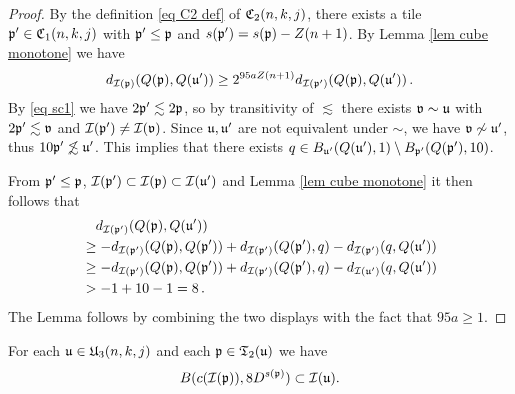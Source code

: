\begin{proof}
    By the definition \eqref{eq C2 def} of $\mathfrak C_2(n,k,j)$, there exists a tile $\mathfrak p' \in \mathfrak C_1(n,k,j)$ with $\mathfrak p' \le \mathfrak p$ and $s(\mathfrak p') = s(\mathfrak p)- Z(n+1)$.
    By Lemma \ref{lem cube monotone} we have
    $$
        d_{\mathcal{I}(\mathfrak p)}(Q(\mathfrak p), Q(\mathfrak u')) \ge 2^{95a Z(n+1)} d_{\mathcal{I}(\mathfrak p')}(Q(\mathfrak p), Q(\mathfrak u'))\,.
    $$
    By \eqref{eq sc1} we have $2\mathfrak p' \lesssim 2\mathfrak p$, so by transitivity of $\lesssim$ there exists $\mathfrak{v} \sim \mathfrak u$ with $2\mathfrak p' \lesssim \mathfrak{v}$ and $\mathcal{I}(\mathfrak p') \ne \mathcal{I}(\mathfrak{v})$. Since $\mathfrak u, \mathfrak u'$ are not equivalent under $\sim$, we have $\mathfrak{v} \not \sim \mathfrak u'$, thus $10\mathfrak p' \not\lesssim \mathfrak u'$. This implies that there exists $q \in B_{\mathfrak u'}(Q(\mathfrak u'), 1) \setminus B_{\mathfrak p'}(Q(\mathfrak p'), 10)$.

    From $\mathfrak p' \le \mathfrak p$, $\mathcal{I}(\mathfrak p') \subset \mathcal{I}(\mathfrak p) \subset \mathcal{I}(\mathfrak u')$ and Lemma \ref{lem cube monotone} it then follows that
    \begin{align*}
        &\quad d_{\mathcal{I}(\mathfrak p')}(Q(\mathfrak p), Q(\mathfrak u'))\\
        &\ge -d_{\mathcal{I}(\mathfrak p')}(Q(\mathfrak p), Q(\mathfrak p')) + d_{\mathcal{I}(\mathfrak p')}(Q(\mathfrak p'), q) - d_{\mathcal{I}(\mathfrak p')}(q, Q(\mathfrak u'))\\
        &\ge -d_{\mathcal{I}(\mathfrak p')}(Q(\mathfrak p), Q(\mathfrak p')) + d_{\mathcal{I}(\mathfrak p')}(Q(\mathfrak p'), q) - d_{\mathcal{I}(\mathfrak u')}(q, Q(\mathfrak u'))\\
        &> -1 + 10 - 1 = 8\,.
    \end{align*}
    The Lemma follows by combining the two displays with the fact that $95 a \ge 1$.
\end{proof}

\begin{lemma}
    \label{lem normal proof}
    For each $\mathfrak u\in \mathfrak U_3(n,k,j)$
    and each $\mathfrak p \in \mathfrak{T}_2(\mathfrak u)$
    we have
    \begin{equation}
        B(c(\mathcal{I}(\mathfrak p)), 8 D^{s(\mathfrak p)}) \subset \mathcal{I}(\mathfrak u).
    \end{equation}
\end{lemma}

